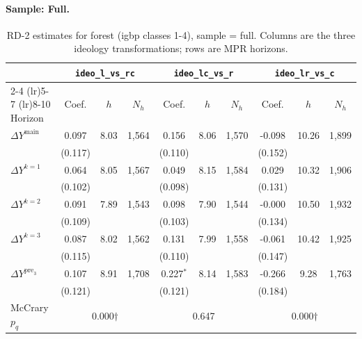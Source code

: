 \documentclass[11pt]{article}
\begin{document}
\paragraph{Sample: Full.}
\begin{table}[H]
\centering
\scriptsize
\caption{RD-2 estimates for forest (igbp classes 1-4), sample = full.
Columns are the three ideology transformations; rows are MPR horizons.}
\label{tab:rd2_forest_all}
\begin{tabular}{l ccc ccc ccc}
\toprule
 & \multicolumn{3}{c}{\texttt{ideo\_l\_vs\_rc}}
 & \multicolumn{3}{c}{\texttt{ideo\_lc\_vs\_r}}
 & \multicolumn{3}{c}{\texttt{ideo\_lr\_vs\_c}} \\
\cmidrule(lr){2-4} \cmidrule(lr){5-7} \cmidrule(lr){8-10}
Horizon & Coef. & $h$ & $N_h$ & Coef. & $h$ & $N_h$ & Coef. & $h$ & $N_h$ \\
\midrule
$\Delta Y^{\text{main}}$ & 0.097 & 8.03 & 1,564 & 0.156 & 8.06 & 1,570 & -0.098 & 10.26 & 1,899 \\
 & (0.117) &  &  & (0.110) &  &  & (0.152) &  &  \\
\addlinespace[1pt]
$\Delta Y^{k=1}$ & 0.064 & 8.05 & 1,567 & 0.049 & 8.15 & 1,584 & 0.029 & 10.32 & 1,906 \\
 & (0.102) &  &  & (0.098) &  &  & (0.131) &  &  \\
\addlinespace[1pt]
$\Delta Y^{k=2}$ & 0.091 & 7.89 & 1,543 & 0.098 & 7.90 & 1,544 & -0.000 & 10.50 & 1,932 \\
 & (0.109) &  &  & (0.103) &  &  & (0.134) &  &  \\
\addlinespace[1pt]
$\Delta Y^{k=3}$ & 0.087 & 8.02 & 1,562 & 0.131 & 7.99 & 1,558 & -0.061 & 10.42 & 1,925 \\
 & (0.115) &  &  & (0.110) &  &  & (0.147) &  &  \\
\addlinespace[1pt]
$\Delta Y^{\text{pre}_3}$ & 0.107 & 8.91 & 1,708 & 0.227$^{*}$ & 8.14 & 1,583 & -0.266 & 9.28 & 1,763 \\
 & (0.121) &  &  & (0.121) &  &  & (0.184) &  &  \\
\addlinespace[1pt]
\midrule
McCrary $p_q$ & \multicolumn{3}{c}{0.000$\dagger$} & \multicolumn{3}{c}{0.647} & \multicolumn{3}{c}{0.000$\dagger$} \\
\bottomrule
\end{tabular}
\end{table}
\end{document}
